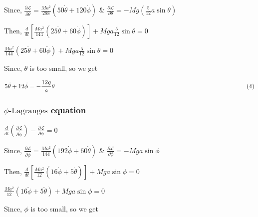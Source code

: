 \documentclass[12pt, a4paper]{article} %
\begin{document}
Since, $\displaystyle \frac{\partial \mathscr{L}}{\partial \dot{\theta}} = \frac{Ma^2}{288}\left(50\dot{\theta} + 120\dot{\phi}\right)$ \& $\displaystyle \frac{\partial \mathscr{L}}{\partial \theta} = -Mg\left(\frac{5}{12}a\sin\theta\right)$

\vspace*{4mm}

Then,  $\displaystyle \frac{d}{dt}\left[\frac{Ma^2}{144}\left(25\dot{\theta} + 60\dot{\phi}\right)\right] + Mga \frac{5}{12}\sin\theta = 0$

\vspace*{4mm}

$\displaystyle \frac{Ma^2}{144}\left(25\ddot{\theta} + 60\ddot{\phi}\right) + Mga \frac{5}{12}\sin\theta = 0$

\vspace*{4mm}

Since, $\theta$ is too small, so we get
\vspace*{4mm}

$\displaystyle 5\ddot{\theta} + 12\ddot{\phi} = -\frac{12g}{a}\theta \hspace*{11cm}(4)$

\subsubsection*{$\phi\mbox{-Lagranges}$ equation}


$\displaystyle \frac{d}{dt}\left(\frac{\partial \mathscr{L}}{\partial \dot{\phi}}\right) - \frac{\partial \mathscr{L}}{\partial \phi} = 0$

\vspace*{4mm}

Since, $\displaystyle \frac{\partial \mathscr{L}}{\partial \dot{\phi}} = \frac{Ma^2}{144}\left(192\dot{\phi} + 60\dot{\theta}\right)$ \& $\displaystyle \frac{\partial \mathscr{L}}{\partial \phi} = -Mga\sin\phi$

\vspace*{4mm}

Then,  $\displaystyle \frac{d}{dt}\left[\frac{Ma^2}{12}\left(16\dot{\phi} + 5\dot{\theta}\right)\right] + Mga\sin\phi = 0$

\vspace*{4mm}

$\displaystyle \frac{Ma^2}{12}\left(16\ddot{\phi} + 5\ddot{\theta}\right) + Mga\sin\phi = 0$

\vspace*{4mm}

Since, $\phi$ is too small, so we get
\vspace*{4mm}
\end{document}
